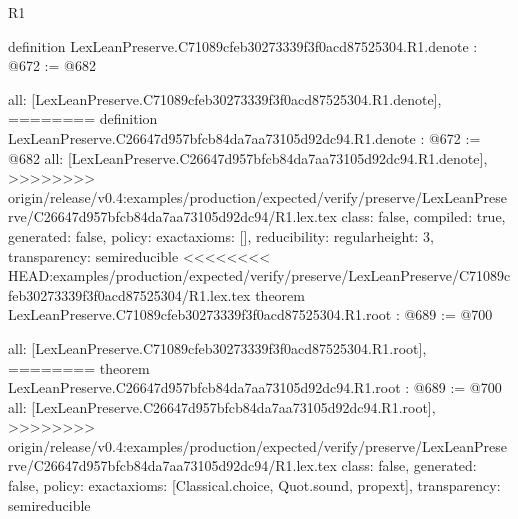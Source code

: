 \begin{lexlean}{R1}
\begin{coremodule}
{{{{{{definition LexLeanPreserve.C71089cfeb30273339f3f0acd87525304.R1.denote : @672 := @682 {
  all: [LexLeanPreserve.C71089cfeb30273339f3f0acd87525304.R1.denote],
========
definition LexLeanPreserve.C26647d957bfcb84da7aa73105d92dc94.R1.denote : @672 := @682 {
  all: [LexLeanPreserve.C26647d957bfcb84da7aa73105d92dc94.R1.denote],
>>>>>>>> origin/release/v0.4:examples/production/expected/verify/preserve/LexLeanPreserve/C26647d957bfcb84da7aa73105d92dc94/R1.lex.tex
  class: false,
  compiled: true,
  generated: false,
  policy: exact{axioms: []},
  reducibility: regular{height: 3},
  transparency: semireducible
}
<<<<<<<< HEAD:examples/production/expected/verify/preserve/LexLeanPreserve/C71089cfeb30273339f3f0acd87525304/R1.lex.tex
theorem LexLeanPreserve.C71089cfeb30273339f3f0acd87525304.R1.root : @689 := @700 {
  all: [LexLeanPreserve.C71089cfeb30273339f3f0acd87525304.R1.root],
========
theorem LexLeanPreserve.C26647d957bfcb84da7aa73105d92dc94.R1.root : @689 := @700 {
  all: [LexLeanPreserve.C26647d957bfcb84da7aa73105d92dc94.R1.root],
>>>>>>>> origin/release/v0.4:examples/production/expected/verify/preserve/LexLeanPreserve/C26647d957bfcb84da7aa73105d92dc94/R1.lex.tex
  class: false,
  generated: false,
  policy: exact{axioms: [Classical.choice, Quot.sound, propext]},
  transparency: semireducible
}

}}}}}}}}
\end{coremodule}
\end{lexlean}
